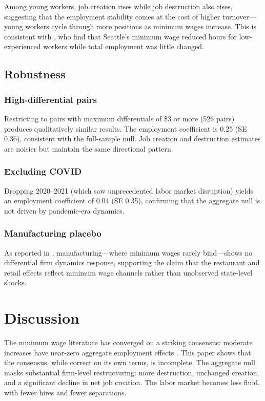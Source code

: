 \documentclass[12pt]{article}
\begin{document}
Among young workers, job creation rises while job destruction also rises, suggesting that the employment stability comes at the cost of higher turnover---young workers cycle through more positions as minimum wages increase. This is consistent with \citet{jardim2022minimum}, who find that Seattle's minimum wage reduced hours for low-experienced workers while total employment was little changed.


\subsection{Robustness}

\subsubsection*{High-differential pairs} Restricting to pairs with maximum differentials of \$3 or more (526 pairs) produces qualitatively similar results. The employment coefficient is 0.25 (SE 0.36), consistent with the full-sample null. Job creation and destruction estimates are noisier but maintain the same directional pattern.

\subsubsection*{Excluding COVID} Dropping 2020--2021 (which saw unprecedented labor market disruption) yields an employment coefficient of 0.04 (SE 0.35), confirming that the aggregate null is not driven by pandemic-era dynamics.

\subsubsection*{Manufacturing placebo} As reported in , manufacturing---where minimum wages rarely bind---shows no differential firm dynamics response, supporting the claim that the restaurant and retail effects reflect minimum wage channels rather than unobserved state-level shocks.


\section{Discussion}

The minimum wage literature has converged on a striking consensus: moderate increases have near-zero aggregate employment effects \citep{manning2021elusive}. This paper shows that the consensus, while correct on its own terms, is incomplete. The aggregate null masks substantial firm-level restructuring: more destruction, unchanged creation, and a significant decline in net job creation. The labor market becomes less fluid, with fewer hires and fewer separations.
\end{document}
